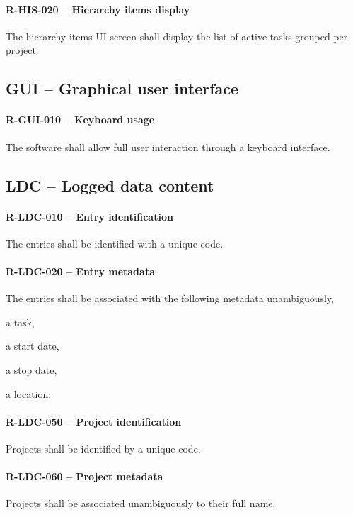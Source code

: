 \paragraph{R-HIS-020 -- Hierarchy items display}
The hierarchy items \gls{UI} screen shall display the list of active tasks
grouped per project.

\subsection{GUI -- Graphical user interface}
\paragraph{R-GUI-010 -- Keyboard usage}
The software shall allow full user interaction through a keyboard interface.

\subsection{LDC -- Logged data content}
\paragraph{R-LDC-010 -- Entry identification}
The entries shall be identified with a unique code.

\paragraph{R-LDC-020 -- Entry metadata}
The entries shall be associated with the following metadata unambiguously,
\begin{compactitem}
\item a task,
\item a start date,
\item a stop date,
\item a location.
\end{compactitem}

\paragraph{R-LDC-050 -- Project identification}
Projects shall be identified by a unique code.

\paragraph{R-LDC-060 -- Project metadata}
Projects shall be associated unambiguously to their full name.

